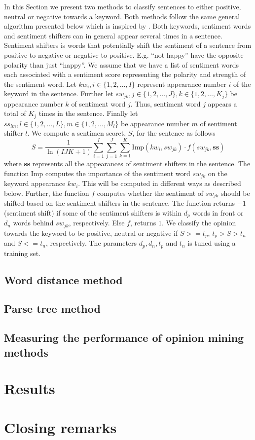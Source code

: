 \documentclass[a4paper, 12pt]{article}
\begin{document}
In this Section we present two methods to classify sentences to either positive, neutral or negative towards a keyword. Both methods follow the same general algorithm presented below which is inspired by  \citet{Ding08}. Both keywords, sentiment words and sentiment shifters can in general appear several times in a sentence. Sentiment shifters is words that potentially shift the sentiment of a sentence from positive to negative or negative to positive. E.g. ``not happy'' have the opposite polarity than just ``happy''. We assume that we have a list of sentiment words each associated with a sentiment score representing the polarity and strength of the sentiment word. Let $kw_i, i \in \{1,2,\ldots,I\}$ represent appearance number $i$ of the keyword in the sentence. Further let $sw_{jk}, j \in \{1,2,\ldots,J\}, k \in\{1,2,\ldots,K_j\}$ be appearance number $k$ of sentiment word $j$. Thus, sentiment word $j$ appears a total of $K_j$ times in the sentence. Finally let $ss_{lm}, l \in \{1,2,\ldots,L\}, m \in\{1,2,\ldots,M_l\}$ be appearance number $m$ of sentiment shifter $l$. We compute a sentimen scoret, $S$, for the sentence as follows
\begin{equation}
  \label{eq:1}
  S = \frac{1}{\ln{(IJK+1)}} \sum_{i=1}^{I} \sum_{j=1}^{J} \sum_{k=1}^{K} \text{Imp}(kw_i, sw_{jk})\cdot f(sw_{jk}, \mathbf{ss})
\end{equation}
where $\mathbf{ss}$ represents all the appearances of sentiment shifters in the sentence. The function Imp computes the importance of the sentiment word $sw_{jk}$ on the keyword appearance $kw_i$. This will be computed in different ways as described below. Further, the function $f$ computes whether the sentiment of $sw_{jk}$ should be shifted based on the sentiment shifters in the sentence. The function returns $-1$ (sentiment shift) if some of the sentiment shifters is within $d_{p}$ words in front or $d_{n}$ words behind $sw_{jk}$, respectively. Else $f$, returns $1$. We classify the opinion towards the keyword to be positive, neutral or negative if $S >= t_p$,  $t_p > S > t_n$ and  $S <= t_n$, respectively. The parameters $d_p, d_n, t_p$ and $t_n$ is tuned using a training set.

\subsection{Word distance method}
\label{sec:wd}

\subsection{Parse tree method}
\label{sec:dp}

\subsection{Measuring the performance of opinion mining methods}
\label{sec:diff}

\section{Results}
\label{sec:results}

\section{Closing remarks}
\label{sec:cr}


\end{document}
